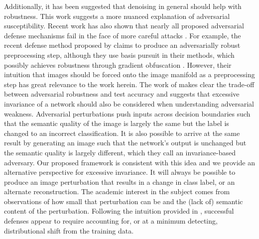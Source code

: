 Additionally, it has been suggested that denoising in general should help with robustness.
This work suggests a more nuanced explanation of adversarial susceptibility.
Recent work has also shown that nearly all proposed adversarial defense mechanisms fail in the face of more careful attacks \parencite{carlini2017towards, athalye2018obfuscated}.
For example, the recent defense method proposed by \cite{sun2018adversarial} claims to produce an adversarially robust preprocessing step, although they use basis pursuit in their methods, which possibly achieves robustness through gradient obfuscation \parencite{athalye2018obfuscated}.
However, their intuition that images should be forced onto the image manifold as a preprocessing step has great relevance to the work herein.
The work of \cite{jacobsen2018excessive} makes clear the trade-off between adversarial robustness and test accuracy and suggests that excessive invariance of a network should also be considered when understanding adversarial weakness.
Adversarial perturbations push inputs across decision boundaries such that the semantic quality of the image is largely the same but the label is changed to an incorrect classification.
It is also possible to arrive at the same result by generating an image such that the network's output is unchanged but the semantic quality is largely different, which they call an invariance-based adversary.
Our proposed framework is consistent with this idea and we provide an alternative perspective for excessive invariance.
It will always be possible to produce an image perturbation that results in a change in class label, or an alternate reconstruction.
The academic interest in the subject comes from observations of how small that perturbation can be and the (lack of) semantic content of the perturbation.
Following the intuition provided in \parencite{ford2019adversarial}, successful defenses appear to require accounting for, or at a minimum detecting, distributional shift from the training data.


